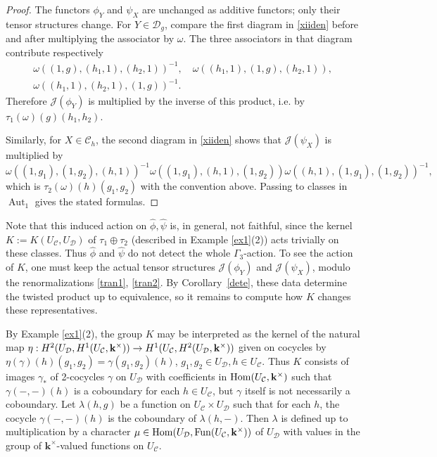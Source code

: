 \documentclass[12pt]{amsart}
\numberwithin{equation}{section}
\theoremstyle{definition}
\newcommand{\Hom}{\text{Hom}}
\newcommand{\Aut}{\text{Aut}}
\newcommand{\1}{_{(1)}}
\newcommand{\2}{_{(2)}}
\newcommand{\3}{_{(3)}}
\newcommand{\4}{_{(4)}}
\newcommand{\5}{_{(5)}}
\newcommand{\6}{_{(6)}}
\newcommand{\C}{\mathcal{C}}
\theoremstyle{plain}
\theoremstyle{definition}
\theoremstyle{remark}
\def\C{\mathcal{C}}
\def\D{\mathcal{D}}
\def\Aut{\mathop{\mathrm{Aut}}\nolimits}
\def\Hom{\mathrm{Hom}}
\def\k{\mathbf{k}}
\begin{document}
\begin{proof}
The functors $\phi_Y$ and $\psi_X$ are unchanged as additive functors; only their tensor structures change.  For $Y\in\D_g$, compare the first diagram in \eqref{xiiden} before and after multiplying the associator by $\omega$.  The three associators in that diagram contribute respectively
\[
\begin{gathered}
\omega((1,g),(h_1,1),(h_2,1))^{-1},\quad
\omega((h_1,1),(1,g),(h_2,1)),\\
\omega((h_1,1),(h_2,1),(1,g))^{-1}.
\end{gathered}
\]
Therefore $\mathcal J(\phi_Y)$ is multiplied by the inverse of this product, i.e. by $\tau_1(\omega)(g)(h_1,h_2)$.

Similarly, for $X\in\C_h$, the second diagram in \eqref{xiiden} shows that $\mathcal J(\psi_X)$ is multiplied by \scriptsize
\[
\omega((1,g_1),(1,g_2),(h,1))^{-1}
\omega((1,g_1),(h,1),(1,g_2))
\omega((h,1),(1,g_1),(1,g_2))^{-1},
\] \normalsize
which is $\tau_2(\omega)(h)(g_1,g_2)$ with the convention above.  Passing to classes in $\Aut_1$ gives the stated formulas.
\end{proof} 

Note that this induced action on $\widehat\phi,\widehat\psi$ is, in general, not faithful, since the kernel $K:=K(U_\C,U_\D)$ of $\tau_1\oplus \tau_2$ (described in Example \ref{ex1}(2)) acts trivially on these classes.  Thus $\widehat\phi$ and $\widehat\psi$ do not detect the whole $\Gamma_3$-action.  To see the action of $K$, one must keep the actual tensor structures $\mathcal J(\phi_Y)$ and $\mathcal J(\psi_X)$, modulo the renormalizations \eqref{tran1}, \eqref{tran2}.  By Corollary~\ref{dete}, these data determine the twisted product up to equivalence, so it remains to compute how $K$ changes these representatives.

By Example \ref{ex1}(2), the group $K$ may be interpreted as the kernel of the natural map 
$\eta: H^2(U_\D,H^1(U_\C,\bold k^\times))\to H^1(U_\C,H^2(U_\D,\bold k^\times))$ given on cocycles by 
$\eta(\gamma)(h)(g_1,g_2)=\gamma(g_1,g_2)(h)$, $g_1,g_2\in U_\D, h\in U_\C$. 
Thus $K$ consists of images $\gamma_*$ of 2-cocycles $\gamma$ on $U_\D$ with coefficients 
in $\Hom(U_\C,\bold k^\times)$ such that $\gamma(-,-)(h)$ is a coboundary 
for each $h\in U_\C$, but $\gamma$ itself is not necessarily a coboundary. 
Let $\lambda(h,g)$ be a function on $U_\C\times U_\D$ such that 
for each $h$, the cocycle $\gamma(-,-)(h)$ is the coboundary of $\lambda(h,-)$. 
Then $\lambda$ is defined up to multiplication by a character $\mu\in \Hom(U_\D,{\rm Fun}(U_\C,\bold k^\times))$ of $U_\D$ with values in the group of $\k^\times$-valued functions 
on $U_\C$. 
\end{document}
